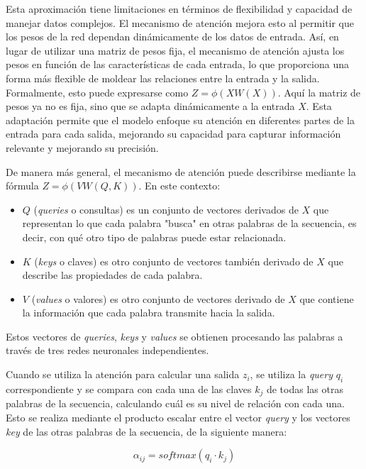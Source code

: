 \documentclass[11pt,spanish,listoffigures,listoftables]{tfgetsinf}
\begin{document}
Esta aproximación tiene limitaciones en términos de flexibilidad y capacidad de manejar datos complejos. El mecanismo de atención mejora esto al permitir que los pesos de la red dependan dinámicamente de los datos de entrada. Así, en lugar de utilizar una matriz de pesos fija, el mecanismo de atención ajusta los pesos en función de las características de cada entrada, lo que proporciona una forma más flexible de moldear las relaciones entre la entrada y la salida. Formalmente, esto puede expresarse como $Z = \phi(XW(X))$. Aquí la matriz de pesos ya no es fija, sino que se adapta dinámicamente a la entrada $X$. Esta adaptación permite que el modelo enfoque su atención en diferentes partes de la entrada para cada salida, mejorando su capacidad para capturar información relevante y mejorando su precisión.

De manera más general, el mecanismo de atención puede describirse mediante la fórmula $Z = \phi(VW(Q, K))$. En este contexto:

\begin{itemize}
\item $Q$ (\textit{queries} o consultas) es un conjunto de vectores derivados de $X$ que representan lo que cada palabra "busca" en otras palabras de la secuencia, es decir, con qué otro tipo de palabras puede estar relacionada.
\item $K$ (\textit{keys} o claves) es otro conjunto de vectores también derivado de $X$ que describe las propiedades de cada palabra.
\item $V$ (\textit{values} o valores) es otro conjunto de vectores derivado de $X$ que contiene la información que cada palabra transmite hacia la salida.
\end{itemize}

Estos vectores de \textit{queries}, \textit{keys} y \textit{values} se obtienen procesando las palabras a través de tres redes neuronales independientes.

Cuando se utiliza la atención para calcular una salida $z_i$, se utiliza la \textit{query} $q_i$ correspondiente  y se compara con cada una de las claves $k_j$ de todas las otras palabras de la secuencia, calculando cuál es su nivel de relación con cada una. Esto se realiza mediante el producto escalar entre el vector \textit{query} y los vectores \textit{key} de las otras palabras de la secuencia, de la siguiente manera:

\begin{equation}
\alpha_{ij} = softmax(q_i \cdot k_j)
\end{equation}
\end{document}
